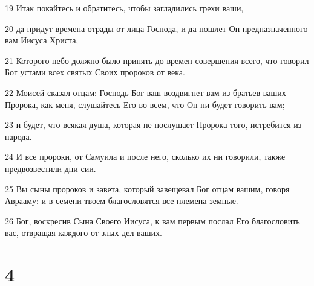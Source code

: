 \par 19 Итак покайтесь и обратитесь, чтобы загладились грехи ваши,
\par 20 да придут времена отрады от лица Господа, и да пошлет Он предназначенного вам Иисуса Христа,
\par 21 Которого небо должно было принять до времен совершения всего, что говорил Бог устами всех святых Своих пророков от века.
\par 22 Моисей сказал отцам: Господь Бог ваш воздвигнет вам из братьев ваших Пророка, как меня, слушайтесь Его во всем, что Он ни будет говорить вам;
\par 23 и будет, что всякая душа, которая не послушает Пророка того, истребится из народа.
\par 24 И все пророки, от Самуила и после него, сколько их ни говорили, также предвозвестили дни сии.
\par 25 Вы сыны пророков и завета, который завещевал Бог отцам вашим, говоря Аврааму: и в семени твоем благословятся все племена земные.
\par 26 Бог, воскресив Сына Своего Иисуса, к вам первым послал Его благословить вас, отвращая каждого от злых дел ваших.

\chapter{4}


